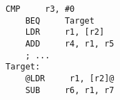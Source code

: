 \begin{lstlisting}[style=AsmStyle]    
    CMP     r3, #0
    BEQ     Target
    LDR     r1, [r2]
    ADD     r4, r1, r5
    ; ...
Target:
    @LDR     r1, [r2]@
    SUB     r6, r1, r7
\end{lstlisting}